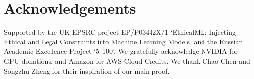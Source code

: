 





\section*{Acknowledgements}
Supported by the UK EPSRC project EP/P03442X/1 `EthicalML: Injecting Ethical and Legal Constraints into Machine Learning Models'
and the Russian Academic Excellence Project `5--100'.
We gratefully acknowledge NVIDIA for GPU donations, and Amazon for AWS Cloud Credits.
We thank Chao Chen and Songzhu Zheng for their inspiration of our main proof.

